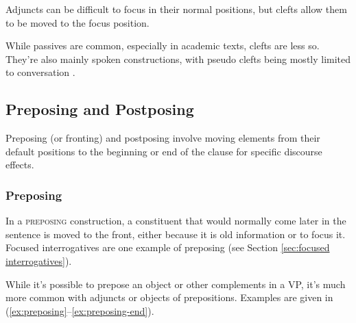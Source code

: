\ea \label{ex:cleft-contrast}
    \z
\z

Adjuncts can be difficult to focus in their normal positions, but clefts allow them to be moved to the focus position.

\ea\label{ex:adjuct-focus}
    \z
\ex\label{ex:adjunct-focus2}
    \z
\z

While passives are common, especially in academic texts, clefts are less so. They're also mainly spoken constructions, with pseudo clefts being mostly limited to conversation \citep[938]{Biber1999}.

\subsection{Preposing and Postposing}

Preposing (or fronting) and postposing involve moving elements from their default positions to the beginning or end of the clause for specific discourse effects.

\subsubsection*{Preposing}\label{sec:preposing}

In a \textsc{preposing} construction, a constituent that would normally come later in the sentence is moved to the front, either because it is old information or to focus it. Focused interrogatives are one example of preposing (see Section \ref{sec:focused interrogatives}). 

While it's possible to prepose an object or other complements in a VP, it's much more common with adjuncts or objects of prepositions. Examples are given in (\ref{ex:preposing}--\ref{ex:preposing-end}).

